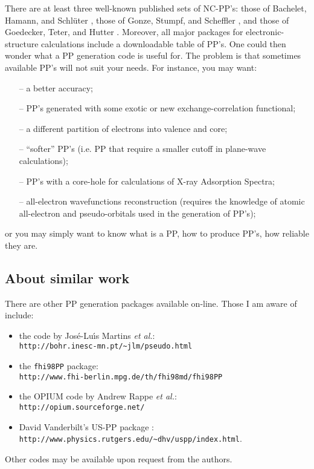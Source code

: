 \documentclass[12pt]{article}
\begin{document}
There are at least three well-known published sets of NC-PP's:
those of Bachelet, Hamann, and Schl\"uter \cite{BHS},
those of Gonze, Stumpf, and Scheffler \cite{Gonze}, and
those of Goedecker, Teter, and Hutter \cite{Goedecker}. 
Moreover, all major packages for electronic-structure calculations
include a downloadable table of PP's. One could then wonder 
what a PP generation code is useful for. The problem is that 
sometimes available PP's will not suit your needs. For instance,
you may want:
\begin{enumerate}
 \item[--] a better accuracy;
 \item[--] PP's generated with some exotic or new exchange-correlation
     functional;
 \item[--] a different partition of electrons into valence and core;
 \item[--] ``softer'' PP's (i.e. PP that require a smaller cutoff
           in plane-wave calculations);
 \item[--] PP's with a core-hole for calculations of X-ray Adsorption
           Spectra;
 \item[--] all-electron wavefunctions reconstruction (requires the
           knowledge of atomic all-electron and pseudo-orbitals used in
           the generation of PP's);
\end{enumerate}
or you may simply want to know what is a PP, how to produce PP's, 
how reliable they are.

\subsection{About similar work}

There are other PP generation packages available on-line.
Those I am aware of include:
\begin{itemize}
\item the code by Jos\'e-Lu{\'\i}s Martins {\em et al.}\cite{TM}:\\
{\tt http://bohr.inesc-mn.pt/\~{}jlm/pseudo.html}
\item the {\tt fhi98PP} package\cite{fhi98PP}:\\
{\tt http://www.fhi-berlin.mpg.de/th/fhi98md/fhi98PP}
\item the OPIUM code by Andrew Rappe {\em et al.}\cite{RRKJ}:\\
{\tt http://opium.sourceforge.net/}
\item David Vanderbilt's US-PP package \cite{van}:\\
{\tt http://www.physics.rutgers.edu/\~{}dhv/uspp/index.html}.
\end{itemize}
Other codes may be available upon request from the authors.
\end{document}
